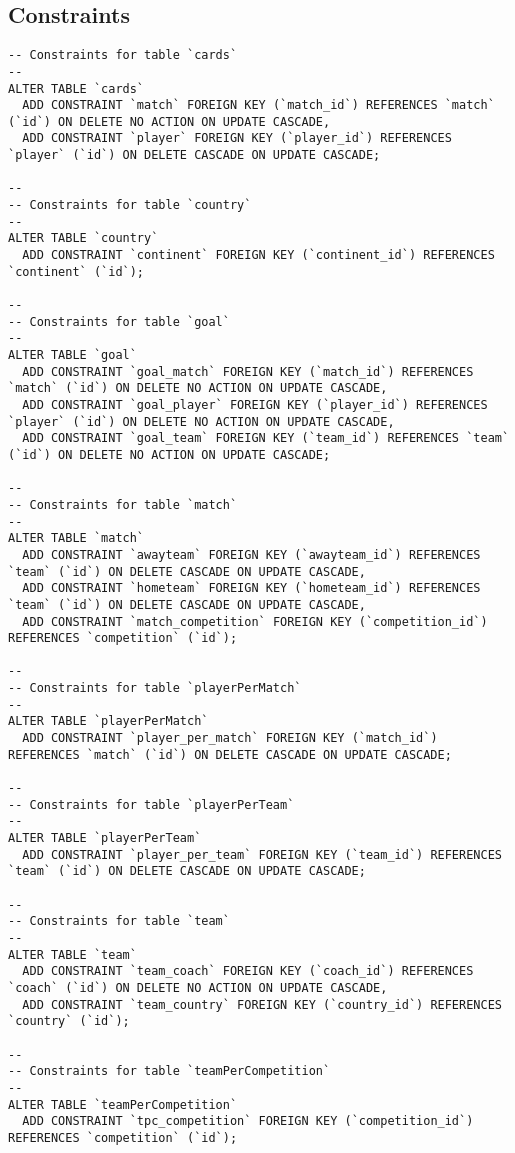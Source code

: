 \documentclass[11pt, a4paper]{article}
\begin{document}
\subsection{Constraints}
\begin{lstlisting}
-- Constraints for table `cards`
--
ALTER TABLE `cards`
  ADD CONSTRAINT `match` FOREIGN KEY (`match_id`) REFERENCES `match` (`id`) ON DELETE NO ACTION ON UPDATE CASCADE,
  ADD CONSTRAINT `player` FOREIGN KEY (`player_id`) REFERENCES `player` (`id`) ON DELETE CASCADE ON UPDATE CASCADE;

--
-- Constraints for table `country`
--
ALTER TABLE `country`
  ADD CONSTRAINT `continent` FOREIGN KEY (`continent_id`) REFERENCES `continent` (`id`);

--
-- Constraints for table `goal`
--
ALTER TABLE `goal`
  ADD CONSTRAINT `goal_match` FOREIGN KEY (`match_id`) REFERENCES `match` (`id`) ON DELETE NO ACTION ON UPDATE CASCADE,
  ADD CONSTRAINT `goal_player` FOREIGN KEY (`player_id`) REFERENCES `player` (`id`) ON DELETE NO ACTION ON UPDATE CASCADE,
  ADD CONSTRAINT `goal_team` FOREIGN KEY (`team_id`) REFERENCES `team` (`id`) ON DELETE NO ACTION ON UPDATE CASCADE;

--
-- Constraints for table `match`
--
ALTER TABLE `match`
  ADD CONSTRAINT `awayteam` FOREIGN KEY (`awayteam_id`) REFERENCES `team` (`id`) ON DELETE CASCADE ON UPDATE CASCADE,
  ADD CONSTRAINT `hometeam` FOREIGN KEY (`hometeam_id`) REFERENCES `team` (`id`) ON DELETE CASCADE ON UPDATE CASCADE,
  ADD CONSTRAINT `match_competition` FOREIGN KEY (`competition_id`) REFERENCES `competition` (`id`);

--
-- Constraints for table `playerPerMatch`
--
ALTER TABLE `playerPerMatch`
  ADD CONSTRAINT `player_per_match` FOREIGN KEY (`match_id`) REFERENCES `match` (`id`) ON DELETE CASCADE ON UPDATE CASCADE;

--
-- Constraints for table `playerPerTeam`
--
ALTER TABLE `playerPerTeam`
  ADD CONSTRAINT `player_per_team` FOREIGN KEY (`team_id`) REFERENCES `team` (`id`) ON DELETE CASCADE ON UPDATE CASCADE;

--
-- Constraints for table `team`
--
ALTER TABLE `team`
  ADD CONSTRAINT `team_coach` FOREIGN KEY (`coach_id`) REFERENCES `coach` (`id`) ON DELETE NO ACTION ON UPDATE CASCADE,
  ADD CONSTRAINT `team_country` FOREIGN KEY (`country_id`) REFERENCES `country` (`id`);

--
-- Constraints for table `teamPerCompetition`
--
ALTER TABLE `teamPerCompetition`
  ADD CONSTRAINT `tpc_competition` FOREIGN KEY (`competition_id`) REFERENCES `competition` (`id`);

\end{lstlisting}
\end{document}
